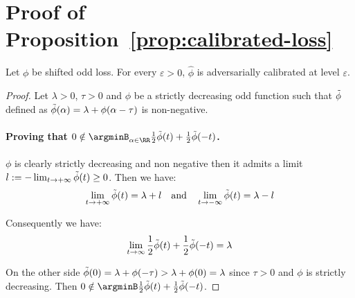 \section{Proof of Proposition~\ref{prop:calibrated-loss}}
\begin{prop*}
Let $\phi$ be shifted odd loss. For every $\varepsilon>0$, $\hat{\phi}$ is adversarially calibrated at level $\varepsilon$.
\end{prop*}
\begin{proof}
Let $\lambda>0$, $\tau>0$ and $\phi$ be a strictly decreasing odd function such that $\Tilde{\phi}$ defined as  $\Tilde{\phi}(\alpha) = \lambda +\phi(\alpha-\tau)$ is non-negative. 

\paragraph{Proving that $0\notin\argminB_{\alpha\in\RR}\frac12\Tilde{\phi}(t)+\frac12 \Tilde{\phi}(-t)$.}${\phi}$ is clearly strictly decreasing and non negative then it admits a limit $l:=-\lim_{t\to+\infty}\Tilde{\phi}(t)\geq0$. Then we have:
\begin{align*}
    \lim_{t\to+\infty}\Tilde{\phi}(t) = \lambda+l\quad\text{and}\quad\lim_{t\to-\infty}\Tilde{\phi}(t) = \lambda-l
\end{align*}

Consequently we have:
\begin{align*}
    \lim_{t\to\infty}\frac12\Tilde{\phi}(t)+\frac12 \Tilde{\phi}(-t)= \lambda
\end{align*}

On the other side $\Tilde{\phi}(0)= \lambda + \phi(-\tau) >\lambda +\phi(0) =\lambda$ since $\tau>0$ and $\phi$ is strictly decreasing. Then $0\notin \argminB\frac12\Tilde{\phi}(t)+\frac12 \Tilde{\phi}(-t)$.



\end{proof}
